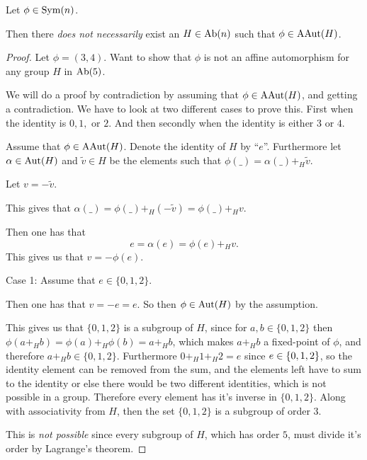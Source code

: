 \begin{counterexample} \label{counterexample:ab-aaut}
    Let \( \phi \in \operatorname{Sym}(n) \).

    Then there \emph{does not necessarily} exist an \( H \in \operatorname{Ab}(n) \) such that \( \phi \in \operatorname{AAut}(H) \).
\end{counterexample}
\begin{proof} %
    Let \( \phi = (3, 4) \). Want to show that \( \phi \) is not an affine automorphism for any group \( H \) in \( \operatorname{Ab}(5) \).

    We will do a proof by contradiction by assuming that \( \phi \in \operatorname{AAut}(H) \), and getting a contradiction. We have to look at two different cases to prove this. First when the identity is \( 0, 1, \) or  \( 2 \). And then secondly when the identity is either \( 3 \) or \( 4 \).

    Assume that \( \phi \in \operatorname{AAut}(H) \). Denote the identity of \( H \) by ``\( e \)''. Furthermore let \( \alpha \in \operatorname{Aut}(H) \) and \( \tilde{v} \in H \) be the elements such that \( \phi(\_) = \alpha(\_) +_H \tilde{v} \).

    Let \( v = -\tilde{v} \).

    This gives that \( \alpha(\_) = \phi(\_) +_H (-\tilde{v}) = \phi(\_) +_H v \).

    Then one has that
    \[
        e = \alpha(e) = \phi(e) +_H v.
    \]
    This gives us that \( v = -\phi(e) \).

    Case 1: Assume that \( e \in \{ 0, 1, 2 \} \).

    Then one has that \( v = -e = e \). So then \( \phi \in \operatorname{Aut}(H) \) by the assumption. 
    
    This gives us that \( \{0, 1, 2\} \) is a subgroup of \( H \), since for \( a, b \in \{0, 1, 2 \} \) then \( \phi(a +_H b) = \phi(a) +_H \phi(b) = a +_H b \), which makes \( a +_H b \) a fixed-point of \( \phi \), and therefore \( a +_H b \in \{0, 1, 2 \} \). Furthermore \( 0 +_H 1 +_H 2 = e \) since \( e \in \left\{ 0, 1, 2 \right\} \), so the identity element can be removed from the sum, and the elements left have to sum to the identity or else there would be two different identities, which is not possible in a group. Therefore every element has it's inverse in \( \{0, 1, 2 \} \). Along with associativity from \( H \), then the set \( \{0, 1, 2 \} \) is a subgroup of order \( 3 \).

    This is \emph{not possible} since every subgroup of \( H \), which has order \( 5 \), must divide it's order by Lagrange's theorem.


\end{proof}
